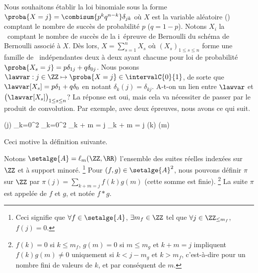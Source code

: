 Nous souhaitons établir la loi binomiale sous la forme
$\proba{X = j} = \combisum{p^k q^{n-k}} \delta_{jk}$
où $X$ est la variable aléatoire (\va) comptant le nombre de succès de probabilité $p$ ($q = 1 - p$).
%
Notons $X_i$ la \va\ comptant le nombre de succès de la i\ieme\ épreuve de Bernoulli du schéma de Bernoulli associé à $X$.
Dès lors,
$X = \sum_{s=1}^{n} X_s$ 
où
$(X_s)_{1 \leq s \leq n}$ forme une famille de \va\ indépendantes deux à deux  ayant chacune pour loi de probabilité $\proba{X_s = j} = p \delta_{1j} + q \delta_{0j}$.
Nous posons
$\lawvar: j \in \ZZ \mapsto \proba{X = j} \in \intervalC{0}{1}$,
de sorte que
$\lawvar[X_s] = p \delta_{1} + q \delta_{0}$
en notant
$\delta_{k}(j) = \delta_{kj}$.
A-t-on un lien entre $\lawvar$ et $\big( \lawvar[X_s] \big)_{1 \leq s \leq n}$? La réponse est oui, mais cela va nécessiter de passer par le produit de convolution.
%
Par exemple, avec deux épreuves, nous avons ce qui suit.


\begin{stepcalc}[style=sar]
	\lawvar(j)
\explnext{}
\explnext{}
	\dsum_{k=0}^{2} 
	\dsum_{k=0}^{2}  
	\dsum_{k + m = j}  
\explnext{}
	\dsum_{k + m = j} \lawvar[X_1](k) \lawvar[X_2](m)
\end{stepcalc}

Ceci motive la définition suivante.




\begin{defi}
	Notons $\setalge{A} = \ell_{\small m}(\ZZ , \RR)$ l'ensemble des suites réelles indexées sur $\ZZ$ et à support minoré.%
	\footnote{
		Ceci signifie que 
		$\forall f \in \setalge{A}$, 
		$\exists m_f \in \ZZ$ 
		tel que
		$\forall j \in \ZZ_{\leq m_f}$, $f(j) = 0$.
	}
	Pour $(f,g) \in \setalge{A}^2$,
	nous pouvons définir $\pi$ sur $\ZZ$ par
	$\pi(j) = \sum_{k + m = j} f(k) g(m)$
	(cette somme est finie).%
	\footnote{
		$f(k) = 0$ si $k \leq m_f$,
		$g(m) = 0$ si $m \leq m_g$
		et
		$k + m = j$
		impliquent
		$f(k) g(m) \neq 0$
		uniquement si
		$k < j - m_g$ et $k > m_f$,
		c'est-à-dire pour un nombre fini de valeurs de $k$, et par conséquent de $m$.
		
	}
	La suite $\pi$ est appelée  de $f$ et $g$,
	et notée $f \ast g$.
\end{defi}


